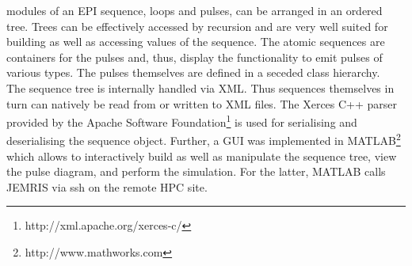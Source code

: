 \documentclass{nic-series}
\begin{document}
modules of an EPI sequence, loops and pulses, can be arranged in an
ordered tree. Trees can be effectively accessed by
recursion and are very well suited for building as well as
accessing values of the sequence. The atomic sequences are containers
for the pulses and, thus, display the functionality to emit pulses of
various types. The pulses themselves are defined in a seceded class hierarchy. 
\\
The sequence tree is internally handled via XML. Thus sequences
themselves in turn can natively be read from or written to XML files. 
The Xerces C++ parser provided by the Apache Software Foundation\footnote{\sf
http://xml.apache.org/xerces-c/} is used for serialising and
deserialising the sequence object. Further, a GUI was implemented in
MATLAB\footnote{\sf http://www.mathworks.com} which allows to
interactively build as well as manipulate the sequence tree, view the pulse diagram, and
perform the simulation. For the latter, MATLAB calls JEMRIS via {\sf
ssh} on the remote HPC site.
\end{document}
